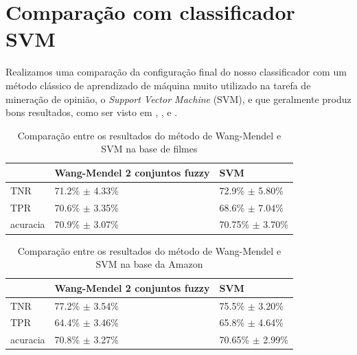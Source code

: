 \documentclass[template.tex]{subfiles}
\begin{document}
\section{Comparação com classificador SVM}


Realizamos uma comparação da configuração final do nosso classificador com um método clássico de aprendizado de máquina muito utilizado na tarefa de mineração de opinião, o \textit{Support Vector Machine} (SVM), e que geralmente produz bons resultados, como ser visto em , ,  e . 

\begin{table}[!h]
    \begin{tabular}{lll}
    ~                   & Wang-Mendel 2 conjuntos fuzzy                     & SVM \\ \hline
    TNR                 & 71.2\% $\pm$ 4.33\%                                           & 72.9\% $\pm$ 5.80\%    \\
    TPR             & 70.6\% $\pm$ 3.35\%                                       & 68.6\% $\pm$ 7.04\%   \\
    acuracia        & 70.9\% $\pm$ 3.07\%                                       & 70.75\% $\pm$ 3.70\%    \\
    \end{tabular}
    \caption{Comparação entre os resultados do método de Wang-Mendel e SVM na base de filmes}
    \label{table:movies_svm}
\end{table}

%
%
%

\begin{table}[!h]
    \begin{tabular}{lll}
    ~                       & Wang-Mendel 2 conjuntos fuzzy                             & SVM \\ \hline
    TNR                     & 77.2\% $\pm$ 3.54\%                                               & 75.5\% $\pm$ 3.20\%    \\
    TPR                 & 64.4\% $\pm$ 3.46\%                                               & 65.8\% $\pm$ 4.64\%   \\
    acuracia           & 70.8\% $\pm$ 3.27\%                                            & 70.65\% $\pm$ 2.99\%    \\
    \end{tabular}
    \caption{Comparação entre os resultados do método de Wang-Mendel e SVM na base da Amazon}
    \label{table:amazon_svm}
\end{table}
\end{document}
